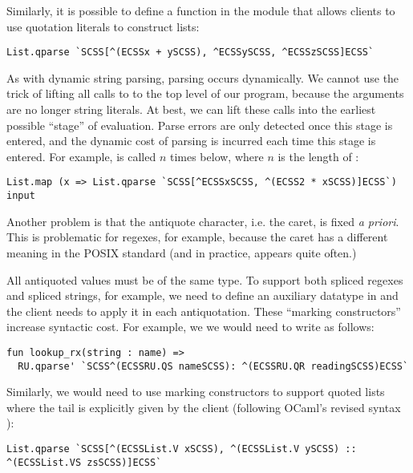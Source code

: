 Similarly, it is possible to define a function  in the  module that allows clients to use quotation literals to construct lists:
\begin{lstlisting}[numbers=none]
List.qparse `SCSS[^(ECSSx + ySCSS), ^ECSSySCSS, ^ECSSzSCSS]ECSS`
\end{lstlisting}


As with dynamic string parsing, parsing occurs dynamically. We cannot use the trick of lifting all calls to  to the top level of our program, because the arguments are no longer string literals. At best, we can lift these calls into the earliest possible ``stage'' of evaluation. Parse errors are only detected once this stage is entered, and the dynamic cost of parsing is incurred each time this stage is entered. For example,  is called $n$ times below, where $n$ is the length of :
\begin{lstlisting}[numbers=none]
List.map (x => List.qparse `SCSS[^ECSSxSCSS, ^(ECSS2 * xSCSS)]ECSS`) input
\end{lstlisting}

Another problem is that the antiquote character, i.e. the caret, is fixed \emph{a priori}. This is problematic for regexes, for example, because the caret has a different meaning in the POSIX standard (and in practice, appears quite often.) 

All antiquoted values must be of the same type. To support both spliced regexes and spliced strings, for example, we need to define an auxiliary datatype in  
and the client needs to apply it in each antiquotation. These ``marking constructors'' increase syntactic cost. 
For example, we we would need to write  as follows:
\begin{lstlisting}[numbers=none]
fun lookup_rx(string : name) =>
  RU.qparse' `SCSS^(ECSSRU.QS nameSCSS): ^(ECSSRU.QR readingSCSS)ECSS`
\end{lstlisting}

Similarly, we would need to use marking constructors to support quoted lists where the tail is explicitly given by the client (following OCaml's revised syntax \cite{ocaml-manual}):
\begin{lstlisting}[numbers=none]
List.qparse `SCSS[^(ECSSList.V xSCSS), ^(ECSSList.V ySCSS) :: ^(ECSSList.VS zsSCSS)]ECSS`
\end{lstlisting}

